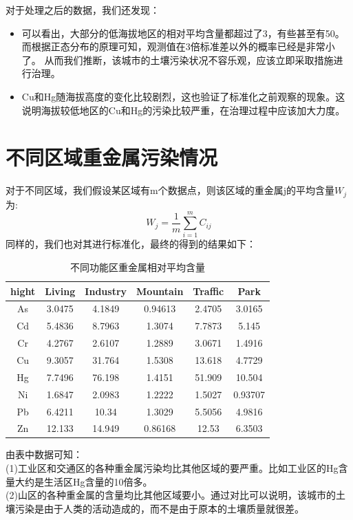 \documentclass[a4paper]{article}
\begin{document}
对于处理之后的数据，我们还发现：
\begin{itemize}
\item 可以看出，大部分的低海拔地区的相对平均含量都超过了3，有些甚至有50。而根据正态分布的原理可知，观测值在3倍标准差以外的概率已经是非常小了。
从而我们推断，该城市的土壤污染状况不容乐观，应该立即采取措施进行治理。
\item Cu和Hg随海拔高度的变化比较剧烈，这也验证了标准化之前观察的现象。这说明海拔较低地区的Cu和Hg的污染比较严重，在治理过程中应该加大力度。
\end{itemize}
\section{不同区域重金属污染情况}
对于不同区域，我们假设某区域有m个数据点，则该区域的重金属j的平均含量$W_j$为:
\begin{equation}
W_j=\frac{1}{m}\sum_{i=1}^m C_{ij}
\end{equation}
\indent 同样的，我们也对其进行标准化，最终的得到的结果如下：
\begin{table}[H]
		\centering
		\caption{不同功能区重金属相对平均含量}
		\label{average-contend}
		\begin{tabular}{c|ccccc}
			hight	  &    Living  &  Industry  &  Mountain  &  Traffic  &   Park    \\
			\hline
			As   & 3.0475  &  4.1849   &   0.94613   &  2.4705   &   3.0165      \\
    			Cd   & 5.4836  &  8.7963   &    1.3074   &  7.7873   &    5.145		\\
    			Cr   & 4.2767  &  2.6107   &    1.2889   &  3.0671   &   1.4916		\\
    			Cu   & 9.3057  &  31.764   &    1.5308   &  13.618   &   4.7729		\\
    			Hg   & 7.7496  &  76.198   &    1.4151   &  51.909   &   10.504		\\
    			Ni   & 1.6847  &  2.0983   &    1.2222   &  1.5027   &  0.93707		\\
    			Pb   & 6.4211  &   10.34   &    1.3029   &  5.5056   &   4.9816		\\
    			Zn   & 12.133  &  14.949   &   0.86168   &   12.53   &   6.3503		\\
		\end{tabular}
	\end{table}
由表中数据可知： \\
\indent (1)工业区和交通区的各种重金属污染均比其他区域的要严重。比如工业区的Hg含量大约是生活区Hg含量的10倍多。                                \\
\indent (2)山区的各种重金属的含量均比其他区域要小。通过对比可以说明，该城市的土壤污染是由于人类的活动造成的，而不是由于原本的土壤质量就很差。     \\
\end{document}
